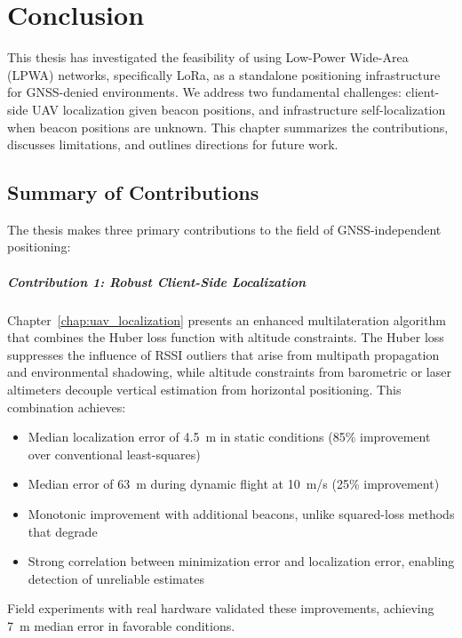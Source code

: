 \documentclass[master,final,11pt]{iscs-thesis}
\begin{document}
\chapter{Conclusion}
\label{chap:conclusion}

This thesis has investigated the feasibility of using Low-Power Wide-Area (LPWA) networks, specifically LoRa, as a standalone positioning infrastructure for GNSS-denied environments.
We address two fundamental challenges: client-side UAV localization given beacon positions, and infrastructure self-localization when beacon positions are unknown.
This chapter summarizes the contributions, discusses limitations, and outlines directions for future work.

\section{Summary of Contributions}
\label{sec:contributions_summary}

The thesis makes three primary contributions to the field of GNSS-independent positioning:

\paragraph{Contribution 1: Robust Client-Side Localization}
Chapter~\ref{chap:uav_localization} presents an enhanced multilateration algorithm that combines the Huber loss function with altitude constraints.
The Huber loss suppresses the influence of RSSI outliers that arise from multipath propagation and environmental shadowing, while altitude constraints from barometric or laser altimeters decouple vertical estimation from horizontal positioning.
This combination achieves:
\begin{itemize}
    \item Median localization error of 4.5~m in static conditions (85\% improvement over conventional least-squares)
    \item Median error of 63~m during dynamic flight at 10~m/s (25\% improvement)
    \item Monotonic improvement with additional beacons, unlike squared-loss methods that degrade
    \item Strong correlation between minimization error and localization error, enabling detection of unreliable estimates
\end{itemize}
Field experiments with real hardware validated these improvements, achieving 7~m median error in favorable conditions.
\end{document}

